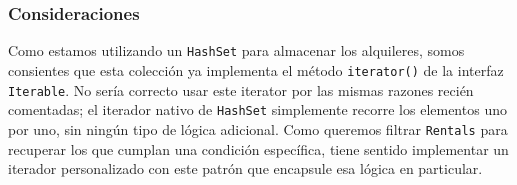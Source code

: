 \subsubsection*{Consideraciones}
Como estamos utilizando un \texttt{HashSet} para almacenar los alquileres, somos consientes que esta colección ya implementa el método \texttt{iterator()} de la 
interfaz \texttt{Iterable}. No sería correcto usar este iterator por las mismas razones recién comentadas; el iterador nativo de \texttt{HashSet} simplemente 
recorre los elementos uno por uno, sin ningún tipo de lógica adicional. Como queremos filtrar \texttt{Rentals} para recuperar los que cumplan una condición específica, 
tiene sentido implementar un iterador personalizado con este patrón que encapsule esa lógica en particular.

\newpage %

